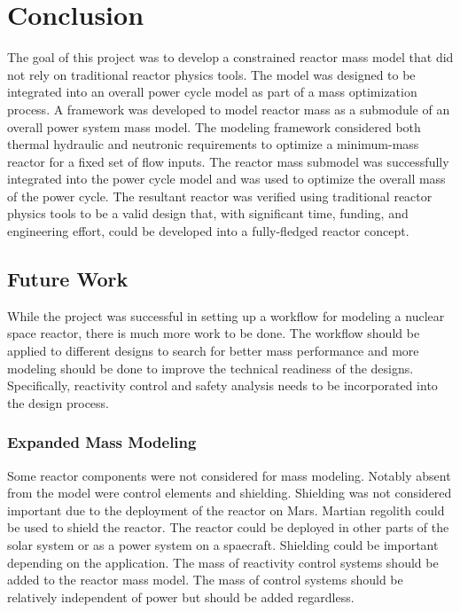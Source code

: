 \chapter{Conclusion}
The goal of this project was to develop a constrained reactor mass model that did not rely
on traditional reactor physics tools. The model was designed to be integrated
into an overall power cycle model as part of a mass optimization process. A
framework was developed to model reactor mass as a submodule of an overall
power system mass model. The modeling framework considered both thermal
hydraulic and neutronic requirements to optimize a minimum-mass reactor for a
fixed set of flow inputs. The reactor mass submodel was successfully integrated
into the power cycle model and was used to optimize the overall mass of the
power cycle. The resultant reactor was verified using traditional reactor
physics tools to be a valid design that, with significant time, funding, and
engineering effort, could be developed into a fully-fledged reactor concept.

\section{Future Work}
While the project was successful in setting up a workflow for modeling a nuclear
space reactor, there is much more work to be done. The workflow should be
applied to different designs to search for better mass performance and more
modeling should be done to improve the technical readiness of the designs.
Specifically, reactivity control and safety analysis needs to be incorporated
into the design process.

\subsection{Expanded Mass Modeling}
Some reactor components were not considered for mass modeling. Notably absent
from the model were control elements and shielding. Shielding was not considered
important due to the deployment of the reactor on Mars. Martian regolith could
be used to shield the reactor. The reactor could be deployed in other parts of
the solar system or as a power system on a spaecraft. Shielding could be
important depending on the application. The mass of reactivity control systems
should be added to the reactor mass model. The mass of control systems should be relatively independent
of power but should be added regardless.

